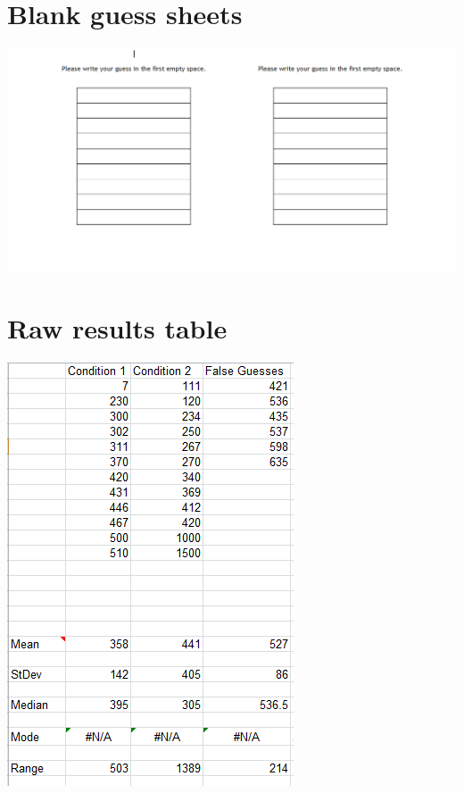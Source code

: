 \documentclass{report}
\begin{document}
\chapter{Blank guess sheets}
\includegraphics[width=\textwidth]{psych2}
\chapter{Raw results table}
\includegraphics[width=\textwidth]{psych3}
\end{document}
